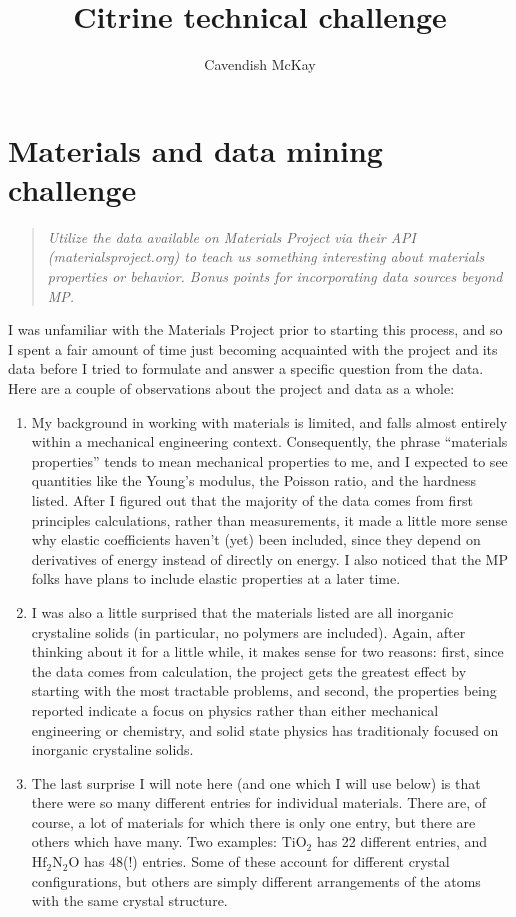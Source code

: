 \documentclass{article}
\author{Cavendish McKay}
\title{Citrine technical challenge}
\begin{document}
\maketitle

\section{Materials and data mining challenge}
\begin{quote} \sl
Utilize the data available on Materials Project via their API (materialsproject.org) to teach us something interesting about materials properties or behavior. Bonus points for incorporating data sources beyond MP.
\end{quote}

I was unfamiliar with the Materials Project prior to starting this process, and so I spent a fair amount of time just becoming acquainted with the project and its data before I tried to formulate and answer a specific question from the data.  Here are a couple of observations about the project and data as a whole:

\begin{enumerate}
\item My background in working with materials is limited, and falls almost entirely within a mechanical engineering context. Consequently, the phrase ``materials properties'' tends to mean mechanical properties to me, and I expected to see quantities like the Young's modulus, the Poisson ratio, and the hardness listed. After I figured out that the majority of the data comes from first principles calculations, rather than measurements, it made a little more sense why elastic coefficients haven't (yet) been included, since they depend on derivatives of energy instead of directly on energy. I also noticed that the MP folks have plans to include elastic properties at a later time.

\item I was also a little surprised that the materials listed are all inorganic crystaline solids (in particular, no polymers are included). Again, after thinking about it for a little while, it makes sense for two reasons: first, since the data comes from calculation, the project gets the greatest effect by starting with the most tractable problems, and second, the properties being reported indicate a focus on physics rather than either mechanical engineering or chemistry, and solid state physics has traditionaly focused on inorganic crystaline solids.

\item The last surprise I will note here (and one which I will use below) is that there were so many different entries for individual materials. There are, of course, a lot of materials for which there is only one entry, but there are others which have many. Two examples: $\mathrm{TiO_2}$ has 22 different entries, and $\mathrm{Hf_2N_2O}$ has 48(!) entries. Some of these account for different crystal configurations, but others are simply different arrangements of the atoms with the same crystal structure. 
\end{enumerate}
\end{document}
